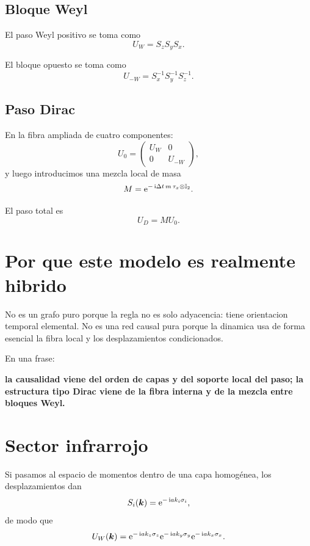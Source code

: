 \subsection{Bloque Weyl}
El paso Weyl positivo se toma como
\begin{equation}
U_W=S_zS_yS_x.
\label{c28:eq:UW}
\end{equation}

El bloque opuesto se toma como
\begin{equation}
U_{-W}=S_x^{-1}S_y^{-1}S_z^{-1}.
\label{c28:eq:UmW}
\end{equation}

\subsection{Paso Dirac}
En la fibra ampliada de cuatro componentes:
\begin{equation}
U_0=
\begin{pmatrix}
U_W & 0\\
0 & U_{-W}
\end{pmatrix},
\end{equation}
y luego introducimos una mezcla local de masa
\begin{equation}
M=\mathrm{e}^{-\,\mathrm{i} \Delta t\,m\,\tau_x\otimes\mathbb{I}_2}.
\label{c28:eq:M}
\end{equation}

El paso total es
\begin{equation}
U_D=MU_0.
\label{c28:eq:UD}
\end{equation}

\section{Por que este modelo es realmente hibrido}
No es un grafo puro porque la regla no es solo adyacencia: tiene orientacion temporal elemental. No es una red causal pura porque la dinamica usa de forma esencial la fibra local y los desplazamientos condicionados.

En una frase:
\begin{displayquote}
\textbf{la causalidad viene del orden de capas y del soporte local del paso; la estructura tipo Dirac viene de la fibra interna y de la mezcla entre bloques Weyl.}
\end{displayquote}

\section{Sector infrarrojo}
Si pasamos al espacio de momentos dentro de una capa homogénea, los desplazamientos dan
\begin{equation}
S_i(\bm{k})=\mathrm{e}^{-\,\mathrm{i} a k_i \sigma_i},
\end{equation}
de modo que
\begin{equation}
U_W(\bm{k})=
\mathrm{e}^{-\,\mathrm{i} a k_z \sigma_z}
\mathrm{e}^{-\,\mathrm{i} a k_y \sigma_y}
\mathrm{e}^{-\,\mathrm{i} a k_x \sigma_x}.
\end{equation}

